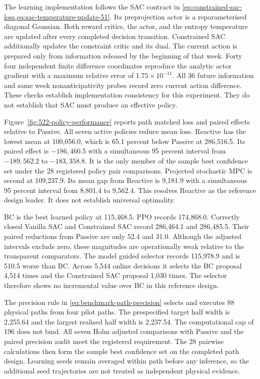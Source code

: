 \documentclass[a4paper,fleqn]{cas-sc}
\begin{document}
The learning implementation follows the SAC contract in
\cref{eq:constrained-sac-loss,eq:sac-temperature-update-51}. Its
preprojection actor is a reparameterised diagonal Gaussian. Both reward
critics, the actor, and the entropy temperature are updated after every
completed decision transition. Constrained SAC additionally updates the
constraint critic and its dual. The current action is prepared only from
information released by the beginning of that week. Forty four independent
finite difference coordinates reproduce the analytic actor gradient with a
maximum relative error of $1.75\times10^{-11}$. All 36 future information and
same week nonanticipativity probes record zero current action difference. These
checks establish implementation consistency for this experiment. They do not
establish that SAC must produce an effective policy.

Figure~\ref{fig:522-policy-performance} reports path matched loss and paired
effects relative to Passive. All seven active policies reduce mean loss.
Reactive has the lowest mean at 100,056.0, which is 65.1 percent below Passive
at 286,516.5. Its paired effect is $-186{,}460.5$ with a simultaneous 95
percent interval from $-189{,}562.2$ to $-183{,}358.8$. It is the only member
of the sample best confidence set under the 28 registered policy pair
comparisons. Projected stochastic MPC is second at 109,237.9. Its mean gap from
Reactive is 9,181.9 with a simultaneous 95 percent interval from 8,801.4 to
9,562.4. This resolves Reactive as the reference design leader. It does not
establish universal optimality.

BC is the best learned policy at 115,468.5. PPO records 174,868.0. Correctly
closed Vanilla SAC and Constrained SAC record 286,464.1 and 286,485.5. Their
paired reductions from Passive are only 52.4 and 31.0. Although the adjusted
intervals exclude zero, these magnitudes are operationally weak relative to the
transparent comparators. The model guided selector records 115,978.9 and is
510.5 worse than BC. Across 5,544 online decisions it selects the BC proposal
4,514 times and the Constrained SAC proposal 1,030 times. The selector therefore
shows no incremental value over BC in this reference design.

The precision rule in \cref{eq:benchmark-path-precision} selects and executes
88 physical paths from four pilot paths. The prespecified target half width is
2,255.64 and the largest realised half width is 2,237.54. The computational cap
of 196 does not bind. All seven Holm adjusted comparisons with Passive and the
paired precision audit meet the registered requirement. The 28 pairwise
calculations then form the sample best confidence set on the completed path
design. Learning seeds remain averaged within path before any inference, so
the additional seed trajectories are not treated as independent physical evidence.
\end{document}
